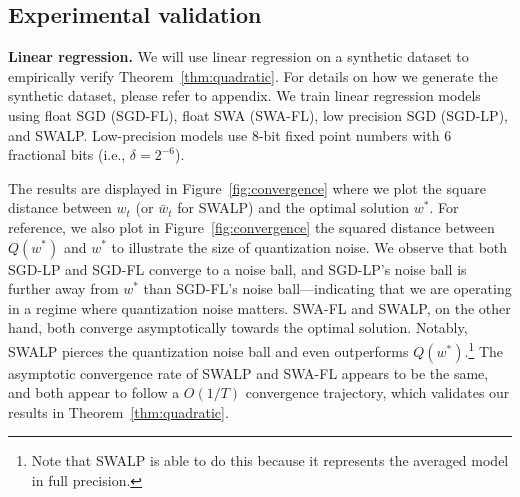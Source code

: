 \documentclass{article}
\begin{document}
\subsection{Experimental validation}\label{sec:convergence-verify}

\textbf{Linear regression.} 
We will use linear regression on a synthetic dataset to empirically verify Theorem~\ref{thm:quadratic}. 
For details on how we generate the synthetic dataset, please refer to appendix.
We train linear regression models using float SGD (SGD-FL), float SWA (SWA-FL), low precision SGD (SGD-LP), and SWALP.
Low-precision models use 8-bit fixed point numbers with 6 fractional bits (i.e., $\delta=2^{-6}$).


The results are displayed in Figure~\ref{fig:convergence} where we plot the square distance between $w_t$ (or $\bar w_t$ for SWALP) and the optimal solution $w^*$.
For reference, we also plot in Figure~\ref{fig:convergence} the squared distance between $Q(w^*)$ and $w^*$ to illustrate the size of quantization noise.
We observe that both SGD-LP and SGD-FL converge to a noise ball, and SGD-LP's noise ball is further away from $w^*$ than SGD-FL's noise ball---indicating that we are operating in a regime where quantization noise matters. 
SWA-FL and SWALP, on the other hand, both converge asymptotically towards the optimal solution.
Notably, SWALP pierces the quantization noise ball and even outperforms $Q(w^*)$.\footnote{Note that SWALP is able to do this because it represents the averaged model in full precision.}
The asymptotic convergence rate of SWALP and SWA-FL appears to be the same, and both appear to follow a $O(1/T)$ convergence trajectory, which validates our results in Theorem~\ref{thm:quadratic}.
\end{document}
